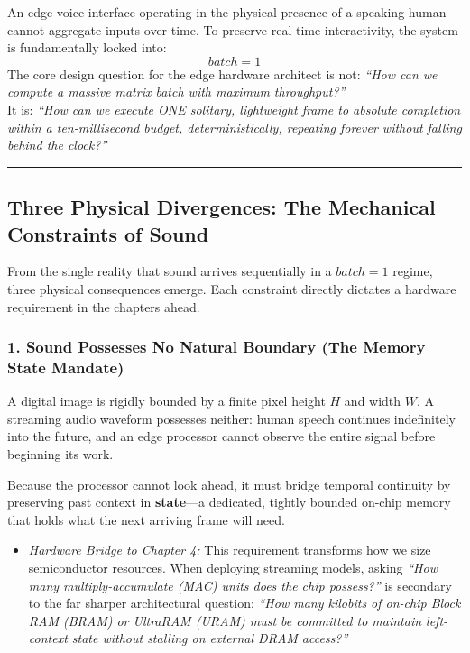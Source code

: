 \documentclass[11pt,a4paper]{article}
\begin{document}
\begin{groundbreaking}
An edge voice interface operating in the physical presence of a speaking human cannot aggregate inputs over time. To preserve real-time interactivity, the system is fundamentally locked into:
\[
batch = 1
\]
The core design question for the edge hardware architect is not: \emph{``How can we compute a massive matrix batch with maximum throughput?''} \\
It is: \emph{``How can we execute ONE solitary, lightweight frame to absolute completion within a ten-millisecond budget, deterministically, repeating forever without falling behind the clock?''}
\end{groundbreaking}

\medskip
\hrule
\medskip

\subsection*{Three Physical Divergences: The Mechanical Constraints of Sound}

From the single reality that sound arrives sequentially in a $batch = 1$ regime, three physical consequences emerge. Each constraint directly dictates a hardware requirement in the chapters ahead.

\subsubsection*{1. Sound Possesses No Natural Boundary (The Memory State Mandate)}
A digital image is rigidly bounded by a finite pixel height $H$ and width $W$. A streaming audio waveform possesses neither: human speech continues indefinitely into the future, and an edge processor cannot observe the entire signal before beginning its work.

Because the processor cannot look ahead, it must bridge temporal continuity by preserving past context in \textbf{state}---a dedicated, tightly bounded on-chip memory that holds what the next arriving frame will need.
\begin{itemize}
    \item \emph{Hardware Bridge to Chapter 4:} This requirement transforms how we size semiconductor resources. When deploying streaming models, asking \emph{``How many multiply-accumulate (MAC) units does the chip possess?''} is secondary to the far sharper architectural question: \emph{``How many kilobits of on-chip Block RAM (BRAM) or UltraRAM (URAM) must be committed to maintain left-context state without stalling on external DRAM access?''}
\end{itemize}
\end{document}
